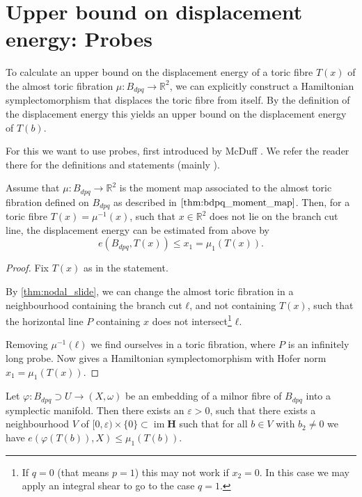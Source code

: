 \documentclass[12pt,a4paper,draft]{scrartcl}
\DeclareMathOperator{\im}{im}
\begin{document}
\section{Upper bound on displacement energy: Probes}
\label{sec:upper_bound}

To calculate an upper bound on the displacement energy of a toric fibre $T(x)$ of the almost toric fibration $\mu \colon B_{dpq}\to \mathbb{R}^2$, we can explicitly construct a Hamiltonian symplectomorphism that displaces the toric fibre from itself.
By the definition of the displacement energy this yields an upper bound on the displacement energy of $T(b)$.

For this we want to use probes, first introduced by McDuff \cite{mcduff2011displacing}. We refer the reader there for the definitions and statements (mainly \cite[Definition 2.3, Lemma 2.4]{mcduff2011displacing}).


\begin{lemma}
    \label{thm:upper_bound}
    Assume that $\mu \colon B_{dpq} \to \mathbb{R}^2$ is the moment map associated to the almost toric fibration defined on $B_{dpq}$ as described in $\cref{thm:bdpq_moment_map}$. 
    Then, for a toric fibre $T(x)=\mu^{-1}(x)$, such that $x \in \mathbb{R}^2$ does not lie on the branch cut line, the displacement energy can be estimated from above by
    \[ e(B_{dpq},T(x))\leq x_1 = μ_1(T(x)). \]
\end{lemma}


\begin{proof}
  Fix $T(x)$ as in the statement.
  
By \cref{thm:nodal_slide}, we can change the almost toric fibration in a neighbourhood containing the branch cut $ℓ$, and not containing $T(x)$, such that the horizontal line $P$ containing $x$ does not intersect\footnote{If $q=0$ (that means $p=1$) this may not work if $x_2=0$. In this case we may apply an integral shear to go to the case $q=1$.} $ℓ$.

Removing $μ^{-1}(ℓ)$ we find ourselves in a toric fibration, where $P$ is an infinitely long probe. Now \cite[Lemma 2.4]{mcduff2011displacing} gives a Hamiltonian symplectomorphism with Hofer norm $x_1 = μ_1(T(x))$.
\end{proof}

\begin{proposition}
\label{thm:upper_bound_embedded}
  Let $φ:B_{dpq} ⊃ U → (X,ω)$ be an embedding of a milnor fibre of $B_{dpq}$ into a symplectic manifold.
  Then there exists an $ε>0$, such that there exists a neighbourhood $V$ of $[0,ε) × \{0\} ⊂ \im{\symbf{H}}$ such that for all $b ∈ V$ with $b_2 ≠ 0$ we have $e(φ(T(b)),X) \leq μ_1(T(b))$.
\end{proposition}
\end{document}
